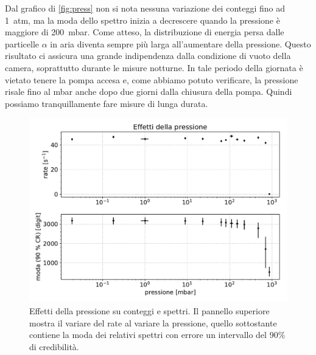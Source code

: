 Dal grafico di \autoref{fig:press} non si nota nessuna variazione dei conteggi fino ad \SI{1}{atm}, ma la moda dello spettro inizia a decrescere quando la pressione è maggiore di \SI{200}{mbar}. 
Come atteso, la distribuzione di energia persa dalle particelle $\alpha$ in aria diventa sempre più larga all'aumentare della pressione.
Questo risultato ci assicura una grande indipendenza dalla condizione di vuoto della camera, soprattutto durante le misure notturne. In tale periodo della giornata è vietato tenere la pompa accesa e, come abbiamo potuto verificare, la pressione risale fino al mbar anche dopo due giorni dalla chiusura della pompa. Quindi possiamo tranquillamente fare misure di lunga durata.

\begin{figure}[h]
\centering
\includegraphics[width=30 em]{immagini/press}
\caption{Effetti della pressione su conteggi e spettri. Il pannello superiore mostra il variare del rate al variare la pressione, quello sottostante contiene la moda dei relativi spettri con errore un intervallo del 90\% di credibilità.}
\label{fig:press}
\end{figure}




